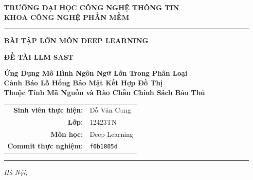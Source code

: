 \documentclass[12pt, a4paper]{article}
\begin{document}
\begin{titlepage}
  \centering
  \vspace*{1cm}

  {\large\bfseries TRƯỜNG ĐẠI HỌC CÔNG NGHỆ THÔNG TIN\\[4pt]
  KHOA CÔNG NGHỆ PHẦN MỀM}

  \vspace{0.5cm}
  \rule{\linewidth}{1.2pt}
  \vspace{0.5cm}

  {\LARGE\bfseries\color{deepblue}
    BÀI TẬP LỚN MÔN DEEP LEARNING\\[10pt]
  }

  \vspace{0.45cm}

  {\Large\bfseries\color{deepblue}ĐỀ TÀI LLM SAST}

  \vspace{0.55cm}

  {\large\bfseries\color{accentred}
    Ứng Dụng Mô Hình Ngôn Ngữ Lớn Trong Phân Loại\\
    Cảnh Báo Lỗ Hổng Bảo Mật Kết Hợp Đồ Thị\\
    Thuộc Tính Mã Nguồn và Rào Chắn Chính Sách Bảo Thủ
  }

  \vspace{1.2cm}

  \begin{tabular}{rl}
    \textbf{Sinh viên thực hiện:} & Đỗ Văn Cung \\[4pt]
    \textbf{Lớp:}                 & 12423TN \\[4pt]
    \textbf{Môn học:}             & Deep Learning \\[4pt]
    \textbf{Commit thực nghiệm:}  & \texttt{f0b1805d}
  \end{tabular}

  \vfill
  \rule{\linewidth}{0.6pt}
  {\small\itshape Hà Nội, \the\year}
\end{titlepage}

\tableofcontents
\newpage
\end{document}
